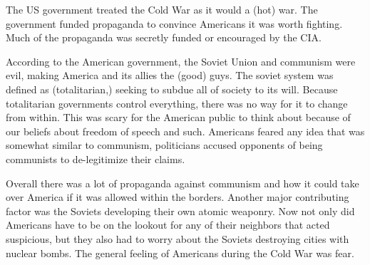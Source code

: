 The US government treated the Cold War as it would a \textquote(hot) war.
The government funded propaganda to convince Americans it was worth fighting.
Much of the propaganda was secretly funded or encouraged by the CIA.

According to the American government, the Soviet Union and communism were evil, making America and its allies the \textquote(good) guys.
The soviet system was defined as \textquote(totalitarian,) seeking to subdue all of society to its will.
Because totalitarian governments control everything, there was no way for it to change from within.
This was scary for the American public to think about because of our beliefs about freedom of speech and such.
Americans feared any idea that was somewhat similar to communism, politicians accused opponents of being communists to de-legitimize their claims.

Overall there was a lot of propaganda against communism and how it could take over America if it was allowed within the borders.
Another major contributing factor was the Soviets developing their own atomic weaponry.
Now not only did Americans have to be on the lookout for any of their neighbors that acted suspicious, but they also had to worry about the Soviets destroying cities with nuclear bombs.
The general feeling of Americans during the Cold War was fear.